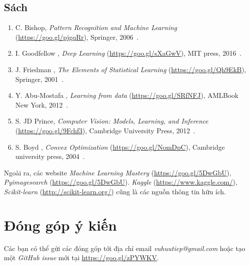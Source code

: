 \subsection{Sách}
\begin{enumerate}

    \item  C. Bishop, \textit{Pattern Recognition and Machine
    Learning} (\url{https://goo.gl/pjgqRr}), Springer,
    2006~\cite{bishop2006pattern}.

    \item I. Goodfellow \etal, 
    \textit{Deep Learning} (\url{https://goo.gl/sXaGwV}), MIT press,
    2016~\cite{Goodfellow-et-al-2016}.

    \item J. Friedman \etal, \textit{The Elements of Statistical
    Learning} (\url{https://goo.gl/Qh9EkB}), Springer, 2001~\cite{friedman2001elements}.
 

    \item Y. Abu-Mostafa \etal, \textit{Learning from data}
    (\url{https://goo.gl/SRfNFJ}), AMLBook New York,
    2012~\cite{abu2012learning}. 
    
    \item S. JD Prince, \textit{Computer Vision: Models, Learning, and
    Inference} (\url{https://goo.gl/9Fchf3}), Cambridge University Press,
    2012~\cite{prince2012computer}.

    \item S. Boyd \etal, \textit{Convex Optimization}
    (\url{https://goo.gl/NomDpC}), Cambridge university
    press, 2004~\cite{boyd2004convex}.

\end{enumerate}
Ngoài ra, các website \textit{Machine Learning Mastery}
(\url{https://goo.gl/5DwGbU}), \textit{Pyimagesearch}
(\url{https://goo.gl/5DwGbU}). \textit{Kaggle} (\url{https://www.kaggle.com/}),
\textit{Scikit-learn} (\url{http://scikit-learn.org/}) cũng là các nguồn thông
tin hữu ích. 

\section{Đóng góp ý kiến}
Các bạn có thể gửi các đóng góp tới địa chỉ email \textit{vuhuutiep@gmail.com}
hoặc tạo một \textit{GitHub issue} mới tại \url{https://goo.gl/zPYWKV}.


